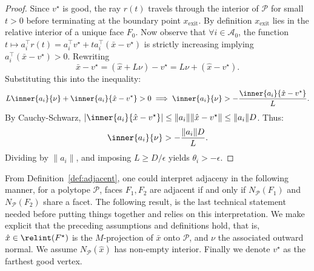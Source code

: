 \begin{proof}
Since $v^\star$ is good, the ray $r(t)$ travels through the interior of $\mathcal{P}$ for small $t > 0$ before terminating at the boundary point $x_{\text{exit}}$. By definition $x_{\text{exit}}$ lies in the relative interior of a unique face $F_0$. Now observe that $\forall i \in \mathcal{A}_0$, the function $t \mapsto a_i^\top r(t) = a_i^\top v^\star + t  a_i^\top(\bar{x} - v^\star)$ is strictly increasing implying $a_i^\top(\bar{x} - v^\star) > 0$.
Rewriting
\begin{equation*}
\bar{x} - v^\star = (\hat{x} + L\nu) - v^\star = L\nu + (\hat{x} - v^\star).
\end{equation*}
Substituting this into the inequality:
\begin{equation*}
L \inner{a_i}{\nu} + \inner{a_i}{\hat{x} - v^\star} > 0 \implies \inner{a_i}{\nu} > -\frac{\inner{a_i}{\hat{x} - v^\star}}{L}.
\end{equation*}
By Cauchy-Schwarz, $|\inner{a_i}{\hat{x} - v^\star}| \leq \|a_i\| \|\hat{x} - v^\star\| \leq \|a_i\| D$. Thus:
\begin{equation*}
\inner{a_i}{\nu} > -\frac{\|a_i\| D}{L}.
\end{equation*}
Dividing by $\|a_i\|$, and imposing $L \geq D/\epsilon$ yields $\theta_i > -\epsilon$.
\end{proof}

From Definition~\ref{def:adjacent}, one could interpret adjaceny in the following manner, for a polytope $\mathcal P$, faces $F_1, F_2$ are adjacent if and only if
$N_{\mathcal P}(F_1)$ and $N_{\mathcal P}(F_2)$ share a facet.
The following result, is the last technical statement needed before putting things together and relies on this interpretation. We make explicit that the preceding assumptions and definitions hold, that is, $\hat{x} \in \relint(F^\star)$ is the $M$-projection of $\bar{x}$ onto $\mathcal{P}$, and
$\nu$ the associated outward normal.
We assume $N_{\mathcal{P}}(\hat{x})$ has non-empty interior. Finally we denote $v^\star$ as the farthest good vertex.

